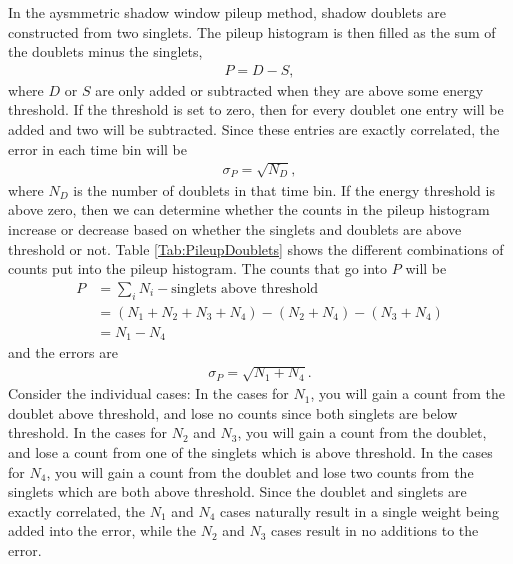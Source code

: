 In the aysmmetric shadow window pileup method, shadow doublets are constructed from two singlets. The pileup histogram is then filled as the sum of the doublets minus the singlets,
 	\begin{align}
 		P = D - S,
	\end{align}
where $D$ or $S$ are only added or subtracted when they are above some energy threshold. If the threshold is set to zero, then for every doublet one entry will be added and two will be subtracted. Since these entries are exactly correlated, the error in each time bin will be 
 	\begin{align}
 		\sigma_{P} = \sqrt{N_{D}},
	\end{align}
where $N_{D}$ is the number of doublets in that time bin. If the energy threshold is above zero, then we can determine whether the counts in the pileup histogram increase or decrease based on whether the singlets and doublets are above threshold or not. Table \ref{Tab:PileupDoublets} shows the different combinations of counts put into the pileup histogram. The counts that go into $P$ will be
	\begin{equation}	
	\begin{aligned}
 		P &= \sum_{i}N_{i} - \text{singlets above threshold} \\
 		  &= (N_{1} + N_{2} + N_{3} + N_{4}) - (N_{2} + N_{4}) - (N_{3} + N_{4}) \\
 		  &= N_{1} - N_{4}
	\end{aligned}
	\end{equation}
and the errors are 
 	\begin{align}
 		\sigma_{P} = \sqrt{N_{1} + N_{4}}.
	\end{align}
Consider the individual cases: In the cases for $N_{1}$, you will gain a count from the doublet above threshold, and lose no counts since both singlets are below threshold. In the cases for $N_{2}$ and $N_{3}$, you will gain a count from the doublet, and lose a count from one of the singlets which is above threshold. In the cases for $N_{4}$, you will gain a count from the doublet and lose two counts from the singlets which are both above threshold. Since the doublet and singlets are exactly correlated, the $N_{1}$ and $N_{4}$ cases naturally result in a single weight being added into the error, while the $N_{2}$ and $N_{3}$ cases result in no additions to the error.

